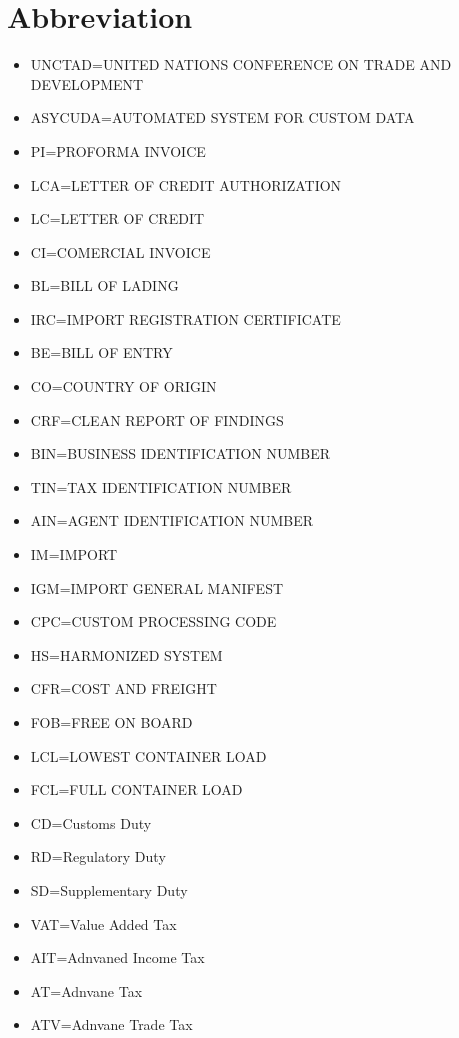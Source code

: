 \documentclass[10pt]{article}
\begin{document}
\section{Abbreviation\label{Abbreviation}}
\begin{itemize}
    \item UNCTAD=UNITED NATIONS CONFERENCE ON TRADE AND DEVELOPMENT
    \item ASYCUDA=AUTOMATED SYSTEM FOR CUSTOM DATA
    \\
    \item PI=PROFORMA INVOICE
    \item LCA=LETTER OF CREDIT AUTHORIZATION
    \item LC=LETTER OF CREDIT
    \item CI=COMERCIAL INVOICE    
    \item BL=BILL OF LADING
    \item IRC=IMPORT REGISTRATION CERTIFICATE
    \item BE=BILL OF ENTRY
    \item CO=COUNTRY OF ORIGIN
    \item CRF=CLEAN REPORT OF FINDINGS
    \\
    \item BIN=BUSINESS IDENTIFICATION NUMBER
    \item TIN=TAX IDENTIFICATION NUMBER
    \item AIN=AGENT IDENTIFICATION NUMBER
    \item IM=IMPORT
    \item IGM=IMPORT GENERAL MANIFEST
    \item CPC=CUSTOM PROCESSING CODE
    \item HS=HARMONIZED SYSTEM
    \item CFR=COST AND FREIGHT
    \item FOB=FREE ON BOARD
    \item LCL=LOWEST CONTAINER LOAD
    \item FCL=FULL CONTAINER LOAD
        \\
    \item CD=Customs Duty
    \item RD=Regulatory Duty
    \item SD=Supplementary Duty
    \item VAT=Value Added Tax
    \item AIT=Adnvaned Income Tax
    \item AT=Adnvane Tax
    \item ATV=Adnvane Trade Tax
\end{itemize}
\end{document}
